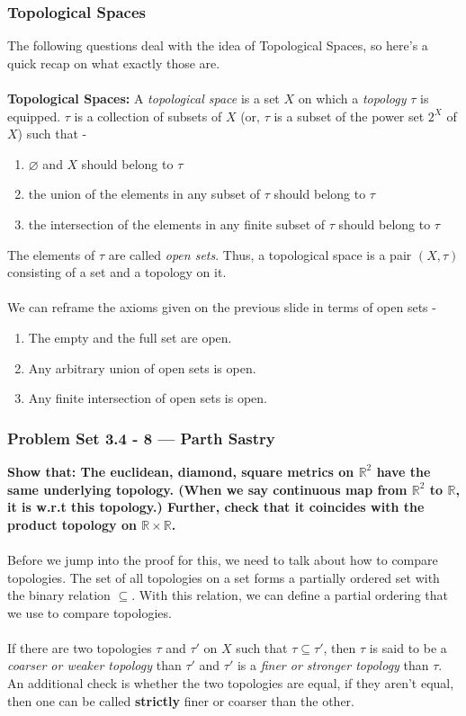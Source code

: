 \begin{frame}
    \frametitle{Topological Spaces}
    The following questions deal with the idea of Topological Spaces, so here's a quick recap on what exactly those are.\\\\
    \textbf{Topological Spaces:} A \textit{topological space} is a set $X$ on which a \textit{topology} $\tau$ is equipped. $\tau$ is a collection of subsets of $X$ (or, $\tau$ is a subset of the power set $2^{X}$ of $X$) such that -

    \begin{enumerate}
        \item $\varnothing$ and $X$ should belong to $\tau$
        \item the union of the elements in any subset of $\tau$ should belong to $\tau$
        \item the intersection of the elements in any finite subset of $\tau$ should belong to $\tau$
    \end{enumerate}
\end{frame}

\begin{frame}
    The elements of $\tau$ are called \textit{open sets}. Thus, a topological space is a pair $(X, \tau)$ consisting of a set and a topology on it.\\\\
    We can reframe the axioms given on the previous slide in terms of open sets - 
    \begin{enumerate}
        \item The empty and the full set are open.
        \item Any arbitrary union of open sets is open.
        \item Any finite intersection of open sets is open.
    \end{enumerate}
\end{frame}

\begin{frame}
    \frametitle{Problem Set 3.4 - 8 --- Parth Sastry}
    \textbf{Show that: The euclidean, diamond, square metrics on $\mathbb{R}^2$ have the same underlying topology. (When we say continuous map from $\mathbb{R}^2$ to $\mathbb{R}$, it is w.r.t this topology.) Further, check that it coincides with the product topology on $\mathbb{R} \times \mathbb{R}$.}\\\\
    \pause
    Before we jump into the proof for this, we need to talk about how to compare topologies. The set of all topologies on a set forms a partially ordered set with the binary relation $\subseteq$. With this relation, we can define a partial ordering that we use to compare topologies. \\\\
    \pause
    If there are two topologies $\tau$ and $\tau'$ on $X$ such that $\tau \subseteq \tau'$, then $\tau$ is said to be a \textit{coarser or weaker topology} than $\tau'$ and $\tau'$ is a \textit{finer or stronger topology} than $\tau$. An additional check is whether the two topologies are equal, if they aren't equal, then one can be called \textbf{strictly} finer or coarser than the other.
\end{frame}


